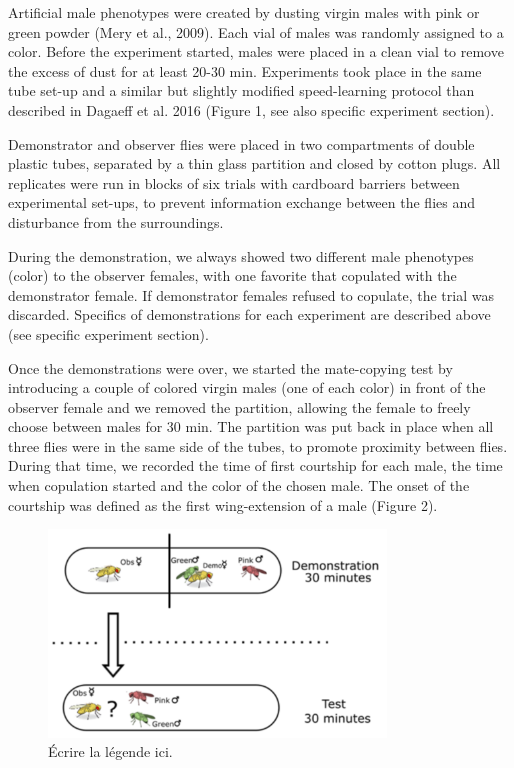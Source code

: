 \documentclass[a4paper, 12pt]{article}
\begin{document}
	Artificial male phenotypes were created by dusting virgin males with pink or green powder (Mery et al., 2009). Each vial of males was randomly assigned to a color. Before the experiment started, males were placed in a clean vial to remove the excess of dust for at least 20-30 min. Experiments took place in the same tube set-up and a similar but slightly modified speed-learning protocol than described in Dagaeff et al. 2016 (Figure 1, see also specific experiment section).
	
	Demonstrator and observer flies were placed in two compartments of double plastic tubes, separated by a thin glass partition and closed by cotton plugs. All replicates were run in blocks of six trials with cardboard barriers between experimental set-ups, to prevent information exchange between the flies and disturbance from the surroundings. 
	
	During the demonstration, we always showed two different male phenotypes (color) to the observer females, with one favorite that copulated with the demonstrator female. If demonstrator females refused to copulate, the trial was discarded. Specifics of demonstrations for each experiment are described above (see specific experiment section).
	
	Once the demonstrations were over, we started the mate-copying test by introducing a couple of colored virgin males (one of each color) in front of the observer female and we removed the partition, allowing the female to freely choose between males for 30 min. The partition was put back in place when all three flies were in the same side of the tubes, to promote proximity between flies. During that time, we recorded the time of first courtship for each male, the time when copulation started and the color of the chosen male. The onset of the courtship was defined as the first wing-extension of a male (Figure 2).

	\begin{figure}
		\centering
		\includegraphics[width=0.8\textwidth]{images/tubes-nolegend.png}
		\caption{Écrire la légende ici.}
	\end{figure}
\end{document}
